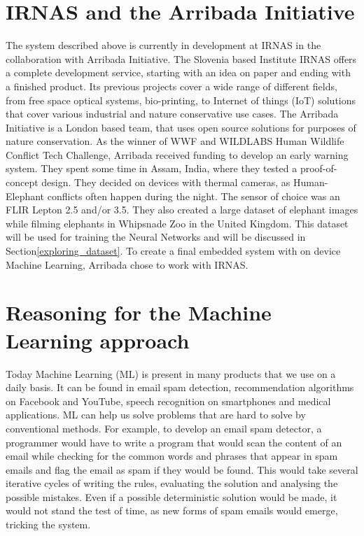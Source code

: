 \section{ IRNAS and the Arribada Initiative}\label{arribada_init}

The system described above is currently in development at IRNAS in the collaboration with Arribada Initiative.
The Slovenia based Institute IRNAS offers a complete development service, starting with an idea on paper and ending with a finished product. 
Its previous projects cover a wide range of different fields, from free space optical systems, bio-printing, to Internet of things (IoT) solutions that cover various industrial and nature conservative use cases.
The Arribada Initiative is a London based team, that uses open source solutions for purposes of nature conservation.
As the winner of WWF and WILDLABS Human Wildlife Conflict Tech Challenge\cite{wildlabs-winners}, Arribada received funding to develop an early warning system.
They spent some time in Assam, India, where they tested a proof-of-concept design\cite{arribada-assam}.
They decided on devices with thermal cameras, as Human-Elephant conflicts often happen during the night.
The sensor of choice was an FLIR Lepton 2.5 and/or 3.5.
They also created a large dataset of elephant images while filming elephants in Whipsnade Zoo in the United Kingdom. 
This dataset will be used for training the Neural Networks and will be discussed in Section\ref{exploring_dataset}.
To create a final embedded system with on device Machine Learning, Arribada chose to work with IRNAS.


\section{ Reasoning for the Machine Learning approach}

Today Machine Learning (ML) is present in many products that we use on a daily basis.
It can be found in email spam detection, recommendation algorithms on Facebook and YouTube, speech recognition on smartphones and medical applications.
ML can help us solve problems that are hard to solve by conventional methods.
For example, to develop an email spam detector, a programmer would have to write a program that would scan the content of an email while checking for the common words and phrases that appear in spam emails and flag the email as spam if they would be found.
This would take several iterative cycles of writing the rules, evaluating the solution and analysing the possible mistakes. 
Even if a possible deterministic solution would be made, it would not stand the test of time, as new forms of spam emails would emerge, tricking the system.

